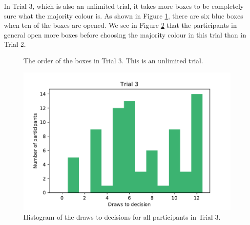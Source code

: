 In Trial 3, which is also an unlimited trial, it takes more boxes to be completely sure what the majority colour is. As shown in Figure \ref{fig:trial3_order}, there are six blue boxes when ten of the boxes are opened. We see in Figure \ref{fig:histogram_trial3} that the participants in general open more boxes before choosing the majority colour in this trial than in Trial 2. 

\begin{figure}
    \centering
    \scalebox{0.8}{}
    \caption[Order of Boxes in Trial 3]{The order of the boxes in Trial 3. This is an unlimited trial.}
    \label{fig:trial3_order}
\end{figure}

\begin{figure}
    \centering
    \includegraphics[scale=0.6]{pictures/dtd3_histogram.pdf}
    \caption[Draws to Decisions in Trial 3]{Histogram of the draws to decisions for all participants in Trial 3.}
    \label{fig:histogram_trial3}
\end{figure}

